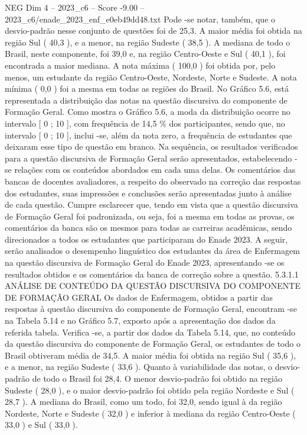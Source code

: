 \begin{textsample}{NEG Dim 4 – 2023\_c6 – Score -9.00 – 2023\_c6/enade\_2023\_enf\_e0eb49dd48.txt}
Pode -se notar, também, que o desvio-padrão nesse conjunto de questões foi de 25,3.
A maior média foi obtida na região Sul ( 40,3 ), e a menor, na região Sudeste ( 38,5 ).
A mediana de todo o Brasil, neste componente, foi 39,0 e, na região Centro-Oeste e Sul ( 40,1 ), foi encontrada a maior mediana.
A nota máxima ( 100,0 ) foi obtida por, pelo menos, um estudante da região Centro-Oeste, Nordeste, Norte e Sudeste.
A nota mínima ( 0,0 ) foi a mesma em todas as regiões do Brasil.
No Gráfico 5.6, está representada a distribuição das notas na questão discursiva do componente de Formação Geral.
Como mostra o Gráfico 5.6, a moda da distribuição ocorre no intervalo [ 0 ; 10 ], com frequência de 14,5 \% dos participantes, sendo que, no intervalo [ 0 ; 10 ], inclui -se, além da nota zero, a frequência de estudantes que deixaram esse tipo de questão em branco.
Na sequência, os resultados verificados para a questão discursiva de Formação Geral serão apresentados, estabelecendo -se relações com os conteúdos abordados em cada uma delas.
Os comentários das bancas de docentes avaliadores, a respeito do observado na correção das respostas dos estudantes, suas impressões e conclusões serão apresentadas junto à análise de cada questão.
Cumpre esclarecer que, tendo em vista que a questão discursiva de Formação Geral foi padronizada, ou seja, foi a mesma em todas as provas, os comentários da banca são os mesmos para todas as carreiras acadêmicas, sendo direcionados a todos os estudantes que participaram do Enade 2023.
A seguir, serão analisados o desempenho linguístico dos estudantes da área de Enfermagem na questão discursiva de Formação Geral do Enade 2023, apresentando -se os resultados obtidos e os comentários da banca de correção sobre a questão. 5.3.1.1 ANÁLISE DE CONTEÚDO DA QUESTÃO DISCURSIVA DO COMPONENTE DE FORMAÇÃO GERAL Os dados de Enfermagem, obtidos a partir das respostas à questão discursiva do componente de Formação Geral, encontram -se na Tabela 5.14 e no Gráfico 5.7, exposto após a apresentação dos dados da referida tabela.
Verifica -se, a partir dos dados da Tabela 5.14, que, no conteúdo da questão discursiva do componente de Formação Geral, os estudantes de todo o Brasil obtiveram média de 34,5.
A maior média foi obtida na região Sul ( 35,6 ), e a menor, na região Sudeste ( 33,6 ).
Quanto à variabilidade das notas, o desvio-padrão de todo o Brasil foi 28,4.
O menor desvio-padrão foi obtido na região Sudeste ( 28,0 ), e o maior desvio-padrão foi obtido pela região Nordeste e Sul ( 28,7 ).
A mediana do Brasil, como um todo, foi 32,0, sendo igual à da região Nordeste, Norte e Sudeste ( 32,0 ) e inferior à mediana da região Centro-Oeste ( 33,0 ) e Sul ( 33,0 ).

\end{textsample}
